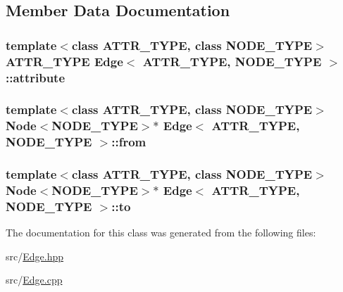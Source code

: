 \subsection{Member Data Documentation}
\hypertarget{class_edge_aefe66838413029050cb582f64f48510e}{
\subsubsection[{attribute}]{\setlength{\rightskip}{0pt plus 5cm}template$<$class A\+T\+T\+R\+\_\+\+T\+Y\+P\+E, class N\+O\+D\+E\+\_\+\+T\+Y\+P\+E$>$ A\+T\+T\+R\+\_\+\+T\+Y\+P\+E {\bf Edge}$<$ A\+T\+T\+R\+\_\+\+T\+Y\+P\+E, N\+O\+D\+E\+\_\+\+T\+Y\+P\+E $>$\+::attribute\hspace{0.3cm}{\ttfamily [private]}}}\label{class_edge_aefe66838413029050cb582f64f48510e}
\hypertarget{class_edge_a13cea896b6ae1a52181316e5e41e9576}{
\subsubsection[{from}]{\setlength{\rightskip}{0pt plus 5cm}template$<$class A\+T\+T\+R\+\_\+\+T\+Y\+P\+E, class N\+O\+D\+E\+\_\+\+T\+Y\+P\+E$>$ {\bf Node}$<$N\+O\+D\+E\+\_\+\+T\+Y\+P\+E$>$$\ast$ {\bf Edge}$<$ A\+T\+T\+R\+\_\+\+T\+Y\+P\+E, N\+O\+D\+E\+\_\+\+T\+Y\+P\+E $>$\+::from\hspace{0.3cm}{\ttfamily [private]}}}\label{class_edge_a13cea896b6ae1a52181316e5e41e9576}
\hypertarget{class_edge_a3e4b84ccacbb450aa7e683b0f138160d}{
\subsubsection[{to}]{\setlength{\rightskip}{0pt plus 5cm}template$<$class A\+T\+T\+R\+\_\+\+T\+Y\+P\+E, class N\+O\+D\+E\+\_\+\+T\+Y\+P\+E$>$ {\bf Node}$<$N\+O\+D\+E\+\_\+\+T\+Y\+P\+E$>$$\ast$ {\bf Edge}$<$ A\+T\+T\+R\+\_\+\+T\+Y\+P\+E, N\+O\+D\+E\+\_\+\+T\+Y\+P\+E $>$\+::to\hspace{0.3cm}{\ttfamily [private]}}}\label{class_edge_a3e4b84ccacbb450aa7e683b0f138160d}


The documentation for this class was generated from the following files\+:\begin{DoxyCompactItemize}
\item 
src/\hyperlink{_edge_8hpp}{Edge.\+hpp}\item 
src/\hyperlink{_edge_8cpp}{Edge.\+cpp}\end{DoxyCompactItemize}

